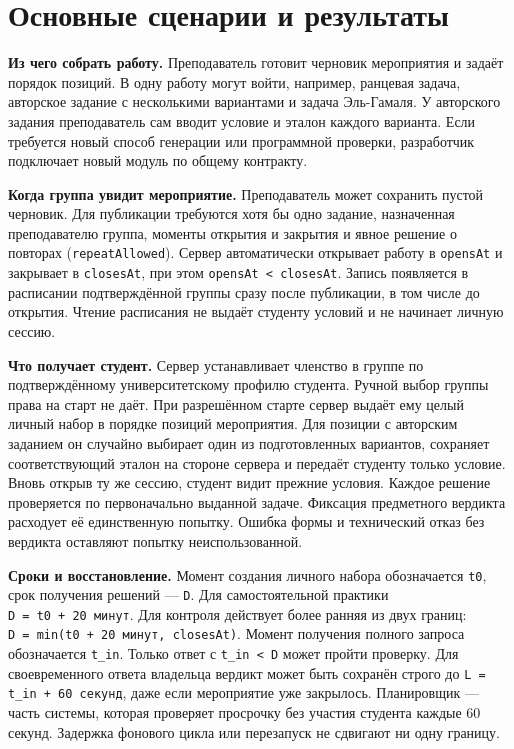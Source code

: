 \documentclass[12pt,a4paper]{article}
\begin{document}
\section{Основные сценарии и результаты}\label{2-ux43eux441ux43dux43eux432ux43dux44bux435-ux441ux446ux435ux43dux430ux440ux438ux438-ux438-ux440ux435ux437ux443ux43bux44cux442ux430ux442ux44b}

\hypertarget{2-основные-сценарии-и-результаты}{}

\textbf{Из чего собрать работу.} Преподаватель готовит черновик мероприятия и задаёт порядок позиций. В одну работу могут войти, например, ранцевая задача, авторское задание с несколькими вариантами и задача Эль-Гамаля. У авторского задания преподаватель сам вводит условие и эталон каждого варианта. Если требуется новый способ генерации или программной проверки, разработчик подключает новый модуль по общему контракту.

\textbf{Когда группа увидит мероприятие.} Преподаватель может сохранить пустой черновик. Для публикации требуются хотя бы одно задание, назначенная преподавателю группа, моменты открытия и закрытия и явное решение о повторах (\texttt{repeatAllowed}). Сервер автоматически открывает работу в \texttt{opensAt} и закрывает в \texttt{closesAt}, при этом \texttt{opensAt\ \textless{}\ closesAt}. Запись появляется в расписании подтверждённой группы сразу после публикации, в том числе до открытия. Чтение расписания не выдаёт студенту условий и не начинает личную сессию.

\textbf{Что получает студент.} Сервер устанавливает членство в группе по подтверждённому университетскому профилю студента. Ручной выбор группы права на старт не даёт. При разрешённом старте сервер выдаёт ему целый личный набор в порядке позиций мероприятия. Для позиции с авторским заданием он случайно выбирает один из подготовленных вариантов, сохраняет соответствующий эталон на стороне сервера и передаёт студенту только условие. Вновь открыв ту же сессию, студент видит прежние условия. Каждое решение проверяется по первоначально выданной задаче. Фиксация предметного вердикта расходует её единственную попытку. Ошибка формы и технический отказ без вердикта оставляют попытку неиспользованной.

\textbf{Сроки и восстановление.} Момент создания личного набора обозначается \texttt{t0}, срок получения решений --- \texttt{D}. Для самостоятельной практики \texttt{D\ =\ t0\ +\ 20\ минут}. Для контроля действует более ранняя из двух границ: \texttt{D\ =\ min(t0\ +\ 20\ минут,\ closesAt)}. Момент получения полного запроса обозначается \texttt{t\_in}. Только ответ с \texttt{t\_in\ \textless{}\ D} может пройти проверку. Для своевременного ответа владельца вердикт может быть сохранён строго до \texttt{L =\allowbreak{} t\_\allowbreak{}in + 60 секунд}, даже если мероприятие уже закрылось. Планировщик --- часть системы, которая проверяет просрочку без участия студента каждые 60 секунд. Задержка фонового цикла или перезапуск не сдвигают ни одну границу.
\end{document}
